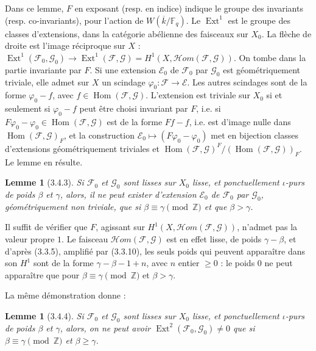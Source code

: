 \documentclass[12pt,a4paper]{article}
\theoremstyle{plain}
\newtheorem{lemma}[theorem]{Lemme}
\theoremstyle{definition}
\theoremstyle{remark}
\DeclareMathOperator{\Ext}{Ext}
\DeclareMathOperator{\Hom}{Hom}
\newcommand{\FF}{{\mathbb{F}}}
\newcommand{\ZZ}{{\mathbb{Z}}}
\begin{document}
Dans ce lemme, $F$ en exposant (resp. en indice) indique le groupe des invariants (resp. co-invariants), pour l'action de $W(\overline{k}/\FF_q)$. Le $\Ext^1$ est le groupe des classes d'extensions, dans la cat\'egorie ab\'elienne des faisceaux sur $X_0$. La fl\`eche de droite est l'image r\'eciproque sur $X$ : $\Ext^1(\mathscr{F}_0, \mathscr{G}_0) \to \Ext^1(\mathscr{F}, \mathscr{G}) = H^1(X, \mathscr{H}om(\mathscr{F}, \mathscr{G}))$. On tombe dans la partie invariante par $F$. Si une extension $\mathscr{E}_0$ de $\mathscr{F}_0$ par $\mathscr{G}_0$ est g\'eom\'etriquement triviale, elle admet sur $X$ un scindage $\varphi_0 : \mathscr{F} \to \mathscr{E}$. Les autres scindages sont de la forme $\varphi_0 - f$, avec $f \in \Hom(\mathscr{F}, \mathscr{G})$. L'extension est triviale sur $X_0$ si et seulement si $\varphi_0 - f$ peut \^etre choisi invariant par $F$, i.e. si $F\varphi_0 - \varphi_0 \in \Hom(\mathscr{F}, \mathscr{G})$ est de la forme $Ff - f$, i.e. est d'image nulle dans $\Hom(\mathscr{F}, \mathscr{G})_F$, et la construction $\mathscr{E}_0 \mapsto (F\varphi_0 - \varphi_0)$ met en bijection classes d'extensions g\'eom\'etriquement triviales et $\Hom(\mathscr{F}, \mathscr{G})^F / (\Hom(\mathscr{F}, \mathscr{G}))_F$. Le lemme en r\'esulte.

\begin{lemma}[3.4.3]
Si $\mathscr{F}_0$ et $\mathscr{G}_0$ sont lisses sur $X_0$ lisse, et ponctuellement $\iota$-purs de poids $\beta$ et $\gamma$, alors, il ne peut exister d'extension $\mathscr{E}_0$ de $\mathscr{F}_0$ par $\mathscr{G}_0$, g\'eom\'etriquement non triviale, que si $\beta \equiv \gamma \pmod{\ZZ}$ et que $\beta > \gamma$.
\end{lemma}

Il suffit de v\'erifier que $F$, agissant sur $H^1(X, \mathscr{H}om(\mathscr{F}, \mathscr{G}))$, n'admet pas la valeur propre $1$. Le faisceau $\mathscr{H}om(\mathscr{F}, \mathscr{G})$ est en effet lisse, de poids $\gamma - \beta$, et d'apr\`es (3.3.5), amplifi\'e par (3.3.10), les seuls poids qui peuvent appara\^itre dans son $H^1$ sont de la forme $\gamma - \beta - 1 + n$, avec $n$ entier $\geq 0$ : le poids $0$ ne peut appara\^itre que pour $\beta \equiv \gamma \pmod{\ZZ}$ et $\beta > \gamma$.

La m\^eme d\'emonstration donne :

\begin{lemma}[3.4.4]
Si $\mathscr{F}_0$ et $\mathscr{G}_0$ sont lisses sur $X_0$ lisse, et ponctuellement $\iota$-purs de poids $\beta$ et $\gamma$, alors, on ne peut avoir $\Ext^2(\mathscr{F}_0, \mathscr{G}_0) \neq 0$ que si $\beta \equiv \gamma \pmod{\ZZ}$ et $\beta \geq \gamma$.
\end{lemma}
\end{document}
